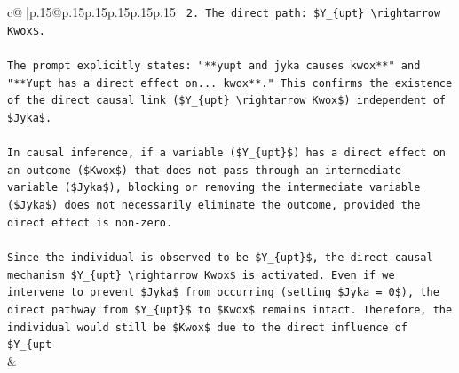 \documentclass{article}
\begin{document}
{\begin{supertabular}{c@{$\;$}|p{.15\linewidth}@{}p{.15\linewidth}p{.15\linewidth}p{.15\linewidth}p{.15\linewidth}p{.15\linewidth}}
{{{\texttt{    2.  The direct path: \$Y\_\{upt\} \textbackslash{}rightarrow Kwox\$.} \\
\\ 
\texttt{The prompt explicitly states: "**yupt and jyka causes kwox**" and "**Yupt has a direct effect on... kwox**." This confirms the existence of the direct causal link (\$Y\_\{upt\} \textbackslash{}rightarrow Kwox\$) independent of \$Jyka\$.} \\
\\ 
\texttt{In causal inference, if a variable (\$Y\_\{upt\}\$) has a direct effect on an outcome (\$Kwox\$) that does not pass through an intermediate variable (\$Jyka\$), blocking or removing the intermediate variable (\$Jyka\$) does not necessarily eliminate the outcome, provided the direct effect is non{-}zero.} \\
\\ 
\texttt{Since the individual is observed to be \$Y\_\{upt\}\$, the direct causal mechanism \$Y\_\{upt\} \textbackslash{}rightarrow Kwox\$ is activated. Even if we intervene to prevent \$Jyka\$ from occurring (setting \$Jyka = 0\$), the direct pathway from \$Y\_\{upt\}\$ to \$Kwox\$ remains intact. Therefore, the individual would still be \$Kwox\$ due to the direct influence of \$Y\_\{upt} \\
            }
        }
    }
    & \\ \\


\end{supertabular}}
\end{document}
